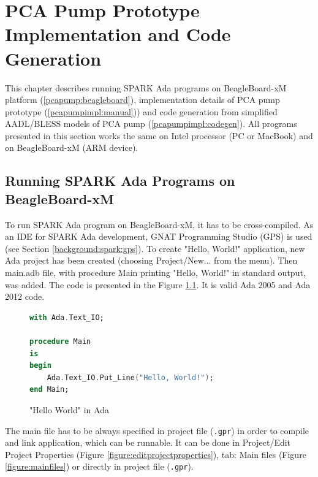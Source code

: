 
\cleardoublepage


\chapter{PCA Pump Prototype Implementation and Code Generation}
\label{pcapumpimpl}

This chapter describes running SPARK Ada programs on BeagleBoard-xM platform (\ref{pcapump:beagleboard}), implementation details of PCA pump prototype (\ref{pcapumpimpl:manual})) and code generation from simplified AADL/BLESS models of PCA pump (\ref{pcapumpimpl:codegen}). All programs presented in this section works the same on Intel processor (PC or MacBook) and on BeagleBoard-xM (ARM device).


\section{Running SPARK Ada Programs on BeagleBoard-xM}
\label{pcapumpimpl:beagleboard}

To run SPARK Ada program on BeagleBoard-xM, it has to be cross-compiled. As an IDE for SPARK Ada development, GNAT Programming Studio (GPS) is used (see Section \ref{background:spark:gps}). To create "Hello, World!" application, new Ada project has been created (choosing Project/New... from the menu). Then main.adb file, with procedure Main printing "Hello, World!" in standard output, was added. The code is presented in the Figure \ref{listing:HelloWorld}. It is valid Ada 2005 and Ada 2012 code.

\begin{figure}
\singlespacing
\begin{lstlisting}[language=ada, frame=single, gobble=0]
with Ada.Text_IO;

procedure Main
is
begin
    Ada.Text_IO.Put_Line("Hello, World!");    
end Main;
\end{lstlisting} 
\doublespacing
\caption{"Hello World" in Ada}
\label{listing:HelloWorld}
\end{figure}


The main file has to be always specified in project file (\lstinline{.gpr}) in order to compile and link application, which can be runnable. It can be done in Project/Edit Project Properties (Figure \ref{figure:editprojectproperties}), tab: Main files (Figure \ref{figure:mainfiles}) or directly in project file (\lstinline{.gpr}).

